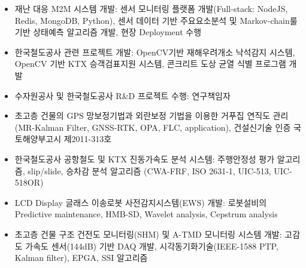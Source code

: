 \documentclass[10pt,a4paper,ragged2e]{altacv}
\begin{document}
\begin{fullwidth}
	\begin{itemize}
		\item 재난 대응 M2M 시스템 개발: 센서 모니터링 플랫폼 개발(Full-stack: NodeJS, Redis, MongoDB, Python), 센서 데이터 기반 주요요소분석 및 Markov-chain룰 기반 상태예측 알고리즘 개발, 현장 Deployment 수행
		\item 한국철도공사 관련 프로젝트 개발: OpenCV기반 재해우려개소 낙석감지 시스템, OpenCV 기반 KTX 승객검표지원 시스템, 콘크리트 도상 균열 식별 프로그램 개발
		\item 수자원공사 및 한국철도공사 R\&D 프로젝트 수행: 연구책임자
	\end{itemize}

	\divider

	\begin{itemize}
		\item 초고층 건물의 GPS 망보정기법과 외란보정 기법을 이용한 거푸집 연직도 관리 (MR-Kalman Filter, GNSS-RTK, OPA, FLC, application), 건설신기술 인증 국토해양부고시 제2011-313호
		\item 한국철도공사 공항철도 및 KTX 진동가속도 분석 시스템: 주행안정성 평가 알고리즘, slip/slide, 승차감 분석 알고리즘 (CWA-FRF, ISO 2631-1, UIC-513, UIC-518OR)
		\item LCD Display 글래스 이송로봇 사전감지시스템(EWS) 개발: 로봇설비의 Predictive maintenance, HMB-SD, Wavelet analysis, Cepstrum analysis
		\item 초고층 건물 구조 건전도 모니터링(SHM) 및 A-TMD 모니터링 시스템 개발: 고감도 가속도 센서(144dB) 기반 DAQ 개발, 시각동기화기술(IEEE-1588 PTP, Kalman filter), EPGA, SSI 알고리즘
	\end{itemize}
\end{fullwidth}

\divider
\begin{fullwidth}



\end{fullwidth}
\end{document}

